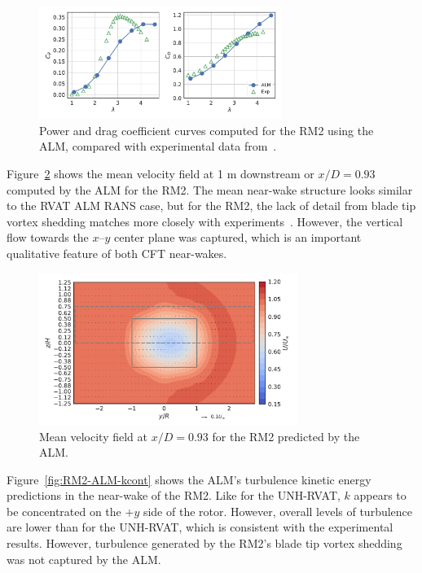\documentclass[times]{weauth}
\begin{document}
\begin{figure}
    \centering

    \includegraphics[width=0.7\textwidth]{RM2-ALM_perf-curves}

    \caption{Power and drag coefficient curves computed for the RM2 using the
        ALM, compared with experimental data from~\cite{Bachant2016-RM2-data}.}

    \label{fig:RM2-ALM-perf-curves}
\end{figure}

Figure~\ref{fig:RM2-ALM-meancontquiv} shows the mean velocity field at 1 m
downstream or $x/D=0.93$ computed by the ALM for the RM2. The mean near-wake
structure looks similar to the RVAT ALM RANS case, but for the RM2, the lack of
detail from blade tip vortex shedding matches more closely with
experiments~\cite{Bachant2016-RM2-paper}. However, the vertical flow towards the
$x$--$y$ center plane was captured, which is an important qualitative feature of
both CFT near-wakes.

\begin{figure}
    \centering

    \includegraphics[width=0.75\textwidth]{RM2-ALM_meancontquiv}

    \caption{Mean velocity field at $x/D=0.93$ for the RM2 predicted by the
        ALM.}

    \label{fig:RM2-ALM-meancontquiv}
\end{figure}

Figure~\ref{fig:RM2-ALM-kcont} shows the ALM's turbulence kinetic energy
predictions in the near-wake of the RM2. Like for the UNH-RVAT, $k$ appears to
be concentrated on the $+y$ side of the rotor. However, overall levels of
turbulence are lower than for the UNH-RVAT, which is consistent with the
experimental results. However, turbulence generated by the RM2's blade tip
vortex shedding was not captured by the ALM.
\end{document}
